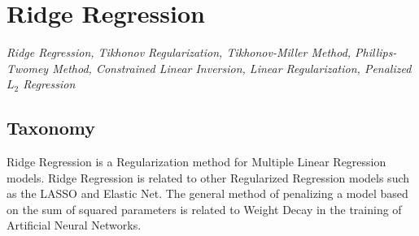 

\section{Ridge Regression} 
\label{sec:ridge}

\emph{Ridge Regression, Tikhonov Regularization, Tikhonov-Miller Method, Phillips-Twomey Method, Constrained Linear Inversion, Linear Regularization, Penalized $L_2$ Regression}

\subsection{Taxonomy}
Ridge Regression is a Regularization method for Multiple Linear Regression models.
Ridge Regression is related to other Regularized Regression models such as the LASSO and Elastic Net.
The general method of penalizing a model based on the sum of squared parameters is related to Weight Decay in the training of Artificial Neural Networks.

